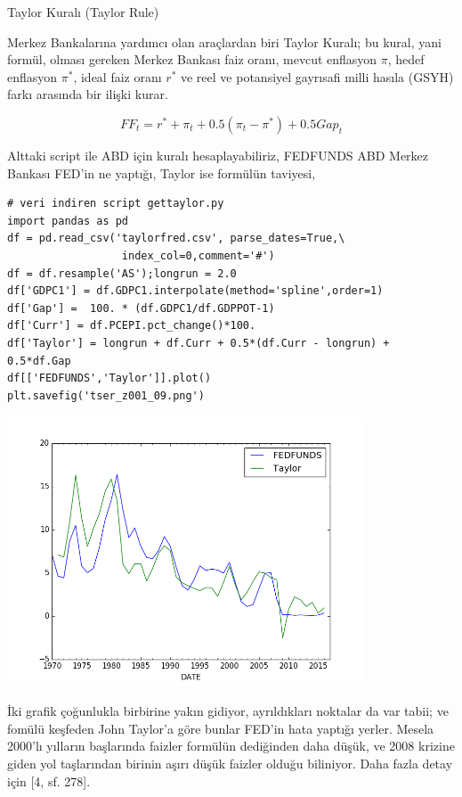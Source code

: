 \documentclass[12pt,fleqn]{article}\usepackage{../../common}
\begin{document}
Taylor Kuralı (Taylor Rule)

Merkez Bankalarına yardımcı olan araçlardan biri Taylor Kuralı; bu kural,
yani formül, olması gereken Merkez Bankası faiz oranı, mevcut enflasyon
$\pi$, hedef enflasyon $\pi^*$, ideal faiz oranı $r^*$ ve reel ve
potansiyel gayrısafi milli hasıla (GSYH) farkı arasında bir ilişki kurar.

$$
FF_t = r^* + \pi_t + 0.5 (\pi_t-\pi^*) + 0.5 Gap_t
$$

Alttaki script ile ABD için kuralı hesaplayabiliriz, FEDFUNDS ABD Merkez Bankası
FED'in ne yaptığı, Taylor ise formülün taviyesi,

\begin{verbatim}
# veri indiren script gettaylor.py 
import pandas as pd
df = pd.read_csv('taylorfred.csv', parse_dates=True,\
                  index_col=0,comment='#')
df = df.resample('AS');longrun = 2.0
df['GDPC1'] = df.GDPC1.interpolate(method='spline',order=1)
df['Gap'] =  100. * (df.GDPC1/df.GDPPOT-1)
df['Curr'] = df.PCEPI.pct_change()*100.
df['Taylor'] = longrun + df.Curr + 0.5*(df.Curr - longrun) + 0.5*df.Gap
df[['FEDFUNDS','Taylor']].plot()
plt.savefig('tser_z001_09.png')
\end{verbatim}

\includegraphics[height=8cm]{tser_z001_09.png}

İki grafik çoğunlukla birbirine yakın gidiyor, ayrıldıkları noktalar da var
tabii; ve fomülü keşfeden John Taylor'a göre bunlar FED'in hata yaptığı
yerler. Mesela 2000'lı yılların başlarında faizler formülün dediğinden daha
düşük, ve 2008 krizine giden yol taşlarından birinin aşırı düşük faizler olduğu
biliniyor. Daha fazla detay için [4, sf. 278]. 

\newpage
\end{document}
